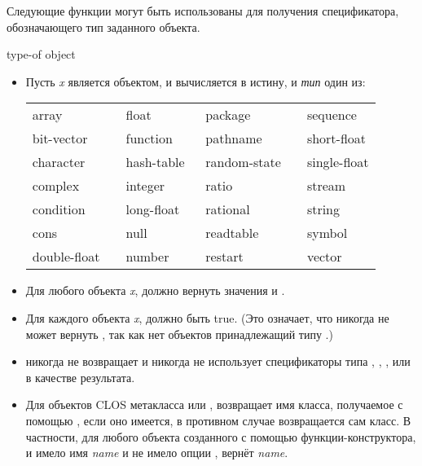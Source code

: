 Следующие функции могут быть использованы для получения спецификатора,
обозначающего тип заданного объекта.

\begin{defun}[Функция]
type-of object

\begin{itemize}
\item
  Пусть \emph{x} является объектом, и 
  вычисляется в истину, и \emph{тип} один из:

  \begin{flushleft}
    \begin{tabular}{@{}llll@{}}
      array          & float        & package        & sequence \\
      bit-vector     & function     & pathname       & short-float \\
      character      & hash-table   & random-state~~ & single-float \\
      complex        & integer      & ratio          & stream \\
      condition      & long-float~~ & rational       & string \\
      cons           & null         & readtable      & symbol \\
      double-float~~ & number       & restart        & vector
    \end{tabular}
  \end{flushleft}

\item
  Для любого объекта \emph{x}, 
  должно вернуть значения  и .

\item
  Для каждого объекта \emph{x}, 
  должно быть true. (Это означает, что  никогда не может вернуть
  , так как нет объектов принадлежащий типу .)

\item
   никогда не возвращает  и никогда не использует
  спецификаторы типа , , ,  или  в
  качестве результата.

\item
  Для объектов CLOS метакласса  или ,
   возвращает имя класса, получаемое с помощью , если оно
  имеется, в противном случае возвращается сам класс.
  В частности, для любого объекта созданного с помощью 
  функции-конструктора, и  имело имя \emph{name} и не имело опции
  ,  вернёт \emph{name}.
\end{itemize}


\end{defun}
